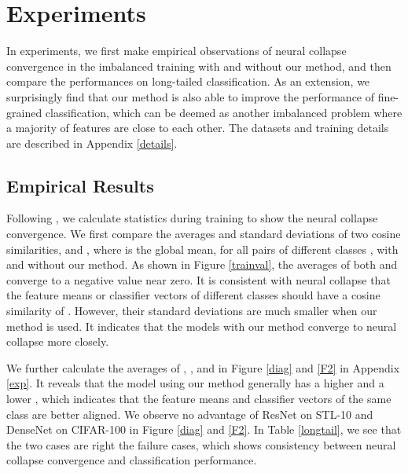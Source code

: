 \documentclass{article}
\newcommand{\<}{\left\langle}
\renewcommand{\>}{\right\rangle}
\begin{document}
\vspace{-1mm}
\section{Experiments}
\vspace{-1mm}

In experiments, we first make empirical observations of neural collapse convergence in the imbalanced training with and without our method, and then compare the performances on long-tailed classification. As an extension, we surprisingly find that our method is also able to improve the performance of fine-grained classification, which can be deemed as another imbalanced problem where a majority of features are close to each other. The datasets and training details are described in Appendix \ref{details}. 


\subsection{Empirical Results}
\label{empirical result}

Following \cite{papyan2020prevalence}, we calculate statistics during training to show the neural collapse convergence. We first compare the averages and standard deviations of two cosine similarities,  and , where  is the global mean, for all pairs of different classes , with and without our method. As shown in Figure \ref{trainval}, the averages of both  and  converge to a negative value near zero. It is consistent with neural collapse that the feature means or classifier vectors of different classes should have a cosine similarity of . However, their standard deviations are much smaller when our method is used. It indicates that the models with our method converge to neural collapse more closely. 




We further calculate the averages of , , and  in Figure \ref{diag} and \ref{F2} in Appendix \ref{exp}. It reveals that the model using our method generally has a higher  and a lower , which indicates that the feature means and classifier vectors of the same class are better aligned. We observe no advantage of ResNet on STL-10 and DenseNet on CIFAR-100 in Figure \ref{diag} and \ref{F2}. In Table \ref{longtail}, we see that the two cases are right the failure cases, which shows consistency between neural collapse convergence and classification performance.
\end{document}

